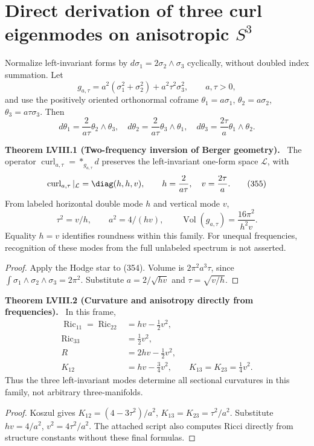 \documentclass[11pt,a4paper,oneside]{book}
\newcommand{\statement}[3]{\par\medskip\noindent\textbf{#1 #2 (#3).}\ }
\begin{document}
\section{Direct derivation of three curl eigenmodes on anisotropic $S^3$}
Normalize left-invariant forms by $d\sigma_1=2\sigma_2\wedge\sigma_3$ cyclically, without doubled index summation. Let
\begin{equation}g_{a,\tau}=a^2(\sigma_1^2+\sigma_2^2)+a^2\tau^2\sigma_3^2,\qquad a,\tau>0,\tag{353}\end{equation}
and use the positively oriented orthonormal coframe $\theta_1=a\sigma_1$, $\theta_2=a\sigma_2$, $\theta_3=a\tau\sigma_3$. Then
\begin{equation}d\theta_1=\frac2{a\tau}\theta_2\wedge\theta_3,\quad d\theta_2=\frac2{a\tau}\theta_3\wedge\theta_1,\quad d\theta_3=\frac{2\tau}a\theta_1\wedge\theta_2.\tag{354}\end{equation}
\statement{Theorem}{LVIII.1}{Two-frequency inversion of Berger geometry}
The operator $\operatorname{curl}_{a,\tau}=*_{g_{a,\tau}}d$ preserves the left-invariant one-form space $\mathcal L$, with
\begin{equation}\operatorname{curl}_{a,\tau}|_{\mathcal L}=\diag(h,h,v),\qquad h=\frac2{a\tau},\quad v=\frac{2\tau}a.\tag{355}\end{equation}
From labeled horizontal double mode $h$ and vertical mode $v$,
\begin{equation}\tau^2=v/h,\qquad a^2=4/(hv),\qquad\operatorname{Vol}(g_{a,\tau})=\frac{16\pi^2}{h^2v}.\tag{356}\end{equation}
Equality $h=v$ identifies roundness within this family. For unequal frequencies, recognition of these modes from the full unlabeled spectrum is not asserted.
\begin{proof}
Apply the Hodge star to (354). Volume is $2\pi^2a^3\tau$, since $\int\sigma_1\wedge\sigma_2\wedge\sigma_3=2\pi^2$. Substitute $a=2/\sqrt{hv}$ and $\tau=\sqrt{v/h}$.
\end{proof}
\statement{Theorem}{LVIII.2}{Curvature and anisotropy directly from frequencies}
In this frame,
\begin{align}\operatorname{Ric}_{11}=\operatorname{Ric}_{22}&=hv-\tfrac12v^2,\tag{357}\\
\operatorname{Ric}_{33}&=\tfrac12v^2,\tag{358}\\
R&=2hv-\tfrac12v^2,\tag{359}\\
K_{12}&=hv-\tfrac34v^2,\qquad K_{13}=K_{23}=\tfrac14v^2.\tag{360}\end{align}
Thus the three left-invariant modes determine all sectional curvatures in this family, not arbitrary three-manifolds.
\begin{proof}
Koszul gives $K_{12}=(4-3\tau^2)/a^2$, $K_{13}=K_{23}=\tau^2/a^2$. Substitute $hv=4/a^2$, $v^2=4\tau^2/a^2$. The attached script also computes Ricci directly from structure constants without these final formulas.
\end{proof}
\end{document}
